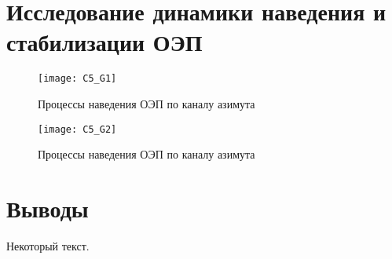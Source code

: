 \section{Исследование динамики наведения и стабилизации ОЭП} \label{ch:ch5/sect4}
\begin{figure}[ht]
	\centering
	\texttt{[image: C5\_G1]} 
	\caption{Процессы наведения ОЭП по каналу азимута}
	\label{fig:az_true}
\end{figure}
\begin{figure}[ht]
	\centering
	\texttt{[image: C5\_G2]} 
	\caption{Процессы наведения ОЭП по каналу азимута}
	\label{fig:az_true}
\end{figure}
\section{Выводы} \label{ch:ch5/sect5}
	


Некоторый текст.

\clearpage